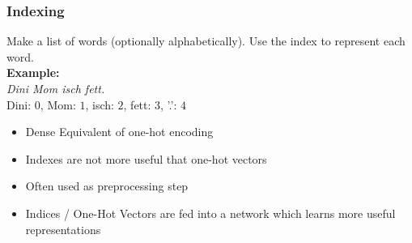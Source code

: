 \subsubsection{Indexing}
Make a list of words (optionally alphabetically). Use the index to represent each word.\\ 
\textbf{Example:}\\
\textit{Dini Mom isch fett.}\\ 
Dini: $0$, Mom: $1$, isch: $2$, fett: $3$, '.': $4$
\begin{itemize}
    \item Dense Equivalent of one-hot encoding
    \item Indexes are not more useful that one-hot vectors
    \item Often used as preprocessing step
    \item Indices / One-Hot Vectors are fed into a network which learns more useful representations
\end{itemize}

